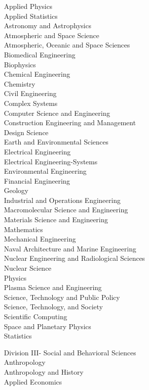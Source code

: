 \begin{enumsubsection}
\begin{enumsubsubsection}
\begin{description}
Applied Physics\\
Applied Statistics\\
Astronomy and Astrophysics\\
Atmospheric and Space Science\\
Atmospheric, Oceanic and Space Sciences\\
Biomedical Engineering\\
Biophysics\\
Chemical Engineering\\
Chemistry\\
Civil Engineering\\
Complex Systems\\
Computer Science and Engineering\\
Construction Engineering and Management\\
Design Science\\
Earth and Environmental Sciences\\
Electrical Engineering\\
Electrical Engineering-Systems\\
Environmental Engineering\\
Financial Engineering\\
Geology\\
Industrial and Operations Engineering\\
Macromolecular Science and Engineering\\
Materials Science and Engineering\\
Mathematics\\
Mechanical Engineering\\
Naval Architecture and Marine Engineering\\
Nuclear Engineering and Radiological Sciences\\
Nuclear Science\\
Physics\\
Plasma Science and Engineering\\
Science, Technology and Public Policy\\
Science, Technology, and Society\\
Scientific Computing\\
Space and Planetary Physics\\
Statistics
\item{Division III- Social and Behavioral Sciences}\\
Anthropology\\
Anthropology and History\\
Applied Economics\\

\end{description}
\end{enumsubsubsection}
\end{enumsubsection}
